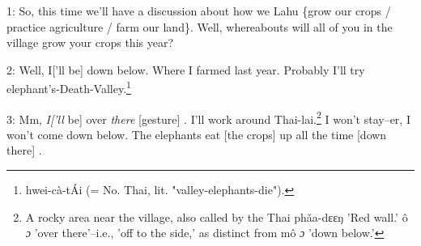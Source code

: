 
1: So, this time we'll have a discussion about how we Lahu \{grow our crops / practice
agriculture / farm our land\}. Well, whereabouts will all of you in the village
grow your crops this year?

2: Well, I['ll be]  down below. Where I farmed last year. Probably I'll try elephant's-Death-Valley.\footnote{hwei-cà-tÁi (= No. Thai, lit. "valley-elephants-die").}

3: Mm, \textit{I['ll} be]  over \textit{there} [gesture] . I'll work around Thai-lai.\footnote{A rocky area near the village, also called by the Thai phǎa-dɛɛŋ 'Red wall.' ô \emph{ɔ} 'over there'--i.e., 'off to the side,' as distinct from mô \emph{ɔ} 'down below.'}
I won't stay--er, I won't come down below. The elephants eat [the crops]  up all
the time [down there] .

